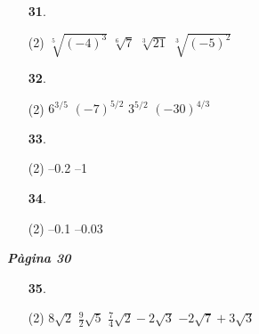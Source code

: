 \documentclass[a4paper, pdf, twoside]{book}
\begin{document}
\begin{multicols}{2}
\begin{enumerate}

 \item[\fontfamily{phv}\selectfont\color{blue}\textbf{31}. ] 
 \begin{tasks}[column-sep=1em, item-indent=1.3333em](2)
	 \task $\sqrt [5]{(-4)^3}$
	 \task $\sqrt [6]{7}$
	 \task $\sqrt [3]{21}$
	 \task $\sqrt [3]{(-5)^2}$
\end{tasks}
\vspace{0.25cm}



 \item[\fontfamily{phv}\selectfont\color{blue}\textbf{32}. ] 
 \begin{tasks}[column-sep=1em, item-indent=1.3333em](2)
	 \task $6^{3/5}$
	 \task $(-7)^{5/2}$
	 \task $3^{5/2}$
	 \task $(-30)^{4/3}$
\end{tasks}
\vspace{0.25cm}



 \item[\fontfamily{phv}\selectfont\color{blue}\textbf{33}. ] 
 \begin{tasks}[column-sep=1em, item-indent=1.3333em](2)
	 \task --0.2
	 \task --1
\end{tasks}
\vspace{0.25cm}



 \item[\fontfamily{phv}\selectfont\color{blue}\textbf{34}. ] 
 \begin{tasks}[column-sep=1em, item-indent=1.3333em](2)
	 \task --0.1
	 \task --0.03
\end{tasks}
 \end{enumerate}
\vspace{0.3cm}


{\textbf{\em Pàgina 30}} \hrulefill
\begin{enumerate}
\vspace{0.25cm}



 \item[\fontfamily{phv}\selectfont\color{blue}\textbf{35}. ] 
 \begin{tasks}[column-sep=1em, item-indent=1.3333em](2)
	 \task $8\sqrt {2}$
	 \task $\frac {9}{2}\sqrt {5}$
	 \task* $\frac {7}{4}\sqrt {2}-2\sqrt {3}$
	 \task $-2\sqrt {7}+3\sqrt {3}$
\end{tasks}
 \end{enumerate}
\begin{enumerate}
\vspace{0.25cm}



\end{enumerate}
\end{multicols}
\end{document}
